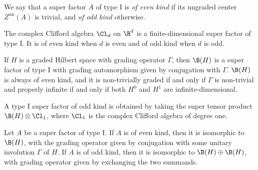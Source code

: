 \begin{Definition}
We say that a super factor $A$ of type I is \emph{of even kind} if its ungraded center $Z^{\mathrm{un}}(A)$ is trivial, and \emph{of odd kind} otherwise.	
\end{Definition}

\begin{Example} \label{ExampleFiniteDimensional}
 The complex Clifford algebra $\Cl_d$ on $\R^d$ is a finite-dimensional super factor of type I.
 It is of even kind when $d$ is even and of odd kind when $d$ is odd.
\end{Example}

\begin{Example} \label{ExampleOddKind}
If $H$ is a graded Hilbert space with grading operator $\Gamma$, then $\B(H)$ is a super factor of type I with grading automorphism given by conjugation with $\Gamma$.
$\B(H)$ is always of even kind, and it is non-trivially graded if and only if $\Gamma$ is non-trivial and properly infinite if and only if both $H^0$ and $H^1$ are infinite-dimensional.
\end{Example}

\begin{Example} \label{ExampleEvenKind}
A type I super factor of odd kind is obtained by taking the super tensor product~${\B(H) \otimes \Cl_1}$, where $\Cl_1$ is the complex Clifford algebra of degree one.
\end{Example}


\begin{Theorem}
\label{ThmClassificationSuperFactorI}
Let $A$ be a super factor of type I.
If $A$ is of even kind, then it is isomorphic to~$\B(H)$, with the grading operator given by conjugation with some unitary involution $\Gamma$ of $H$.
If $A$ is of odd kind, then it is isomorphic to $\B(H) \oplus \B(H)$, with grading operator given by exchanging the two summands.
\end{Theorem}


